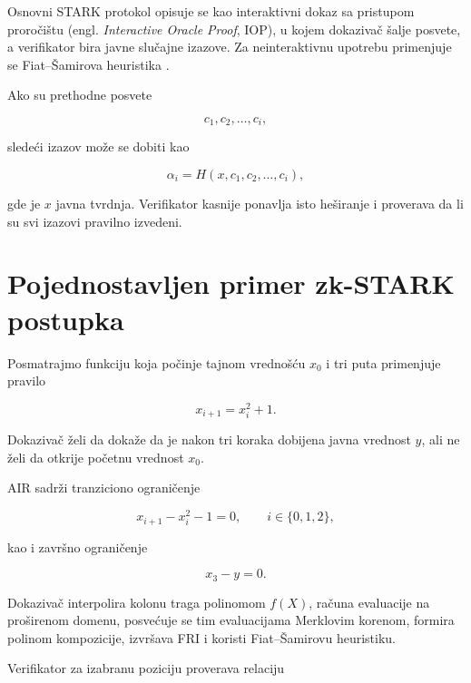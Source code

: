 Osnovni STARK protokol opisuje se kao interaktivni dokaz sa pristupom
proročištu (engl. \textit{Interactive Oracle Proof}, IOP), u kojem dokazivač
šalje posvete, a verifikator bira javne slučajne izazove. Za neinteraktivnu
upotrebu primenjuje se Fiat--Šamirova heuristika \cite{ethstark2023}.

Ako su prethodne posvete

\begin{equation}
    c_1,c_2,\ldots,c_i,
\end{equation}

sledeći izazov može se dobiti kao

\begin{equation}
    \alpha_i = H\left(x,c_1,c_2,\ldots,c_i\right),
\end{equation}

gde je \(x\) javna tvrdnja. Verifikator kasnije ponavlja isto heširanje i
proverava da li su svi izazovi pravilno izvedeni.

\section{Pojednostavljen primer zk-STARK postupka}

Posmatrajmo funkciju koja počinje tajnom vrednošću \(x_0\) i tri puta primenjuje
pravilo

\begin{equation}
    x_{i+1} = x_i^2 + 1.
\end{equation}

Dokazivač želi da dokaže da je nakon tri koraka dobijena javna vrednost \(y\),
ali ne želi da otkrije početnu vrednost \(x_0\).

AIR sadrži tranziciono ograničenje

\begin{equation}
    x_{i+1}-x_i^2-1 = 0,
    \qquad i \in \{0,1,2\},
\end{equation}

kao i završno ograničenje

\begin{equation}
    x_3-y = 0.
\end{equation}

Dokazivač interpolira kolonu traga polinomom \(f(X)\), računa evaluacije na
proširenom domenu, posvećuje se tim evaluacijama Merklovim korenom, formira
polinom kompozicije, izvršava FRI i koristi Fiat--Šamirovu heuristiku.

Verifikator za izabranu poziciju proverava relaciju

